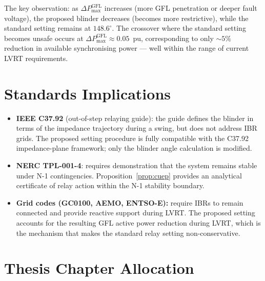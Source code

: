 \documentclass[11pt,a4paper]{article}
\begin{document}
The key observation: as $\Delta P_{\max}^{\mathrm{GFL}}$ increases (more GFL
penetration or deeper fault voltage), the proposed blinder decreases
(becomes more restrictive), while the standard setting remains at $148.6^\circ$.
The crossover where the standard setting becomes unsafe occurs at
$\Delta P_{\max}^{\mathrm{GFL}} \approx 0.05$~pu, corresponding to only
$\sim 5\%$ reduction in available synchronising power — well within the range
of current LVRT requirements.

\section{Standards Implications}
\label{sec:standards}

\begin{itemize}
  \item \textbf{IEEE C37.92} (out-of-step relaying guide): the guide defines
        the blinder in terms of the impedance trajectory during a swing, but
        does not address IBR grids.  The proposed setting procedure is fully
        compatible with the C37.92 impedance-plane framework; only the blinder
        angle calculation is modified.

  \item \textbf{NERC TPL-001-4}: requires demonstration that the system
        remains stable under N-1 contingencies.  Proposition~\ref{prop:cuep}
        provides an analytical certificate of relay action within the N-1
        stability boundary.

  \item \textbf{Grid codes (GC0100, AEMO, ENTSO-E):} require IBRs to remain
        connected and provide reactive support during LVRT.  The proposed
        setting accounts for the resulting GFL active power reduction during
        LVRT, which is the mechanism that makes the standard relay setting
        non-conservative.
\end{itemize}

\section{Thesis Chapter Allocation}
\label{sec:thesis}
\end{document}
